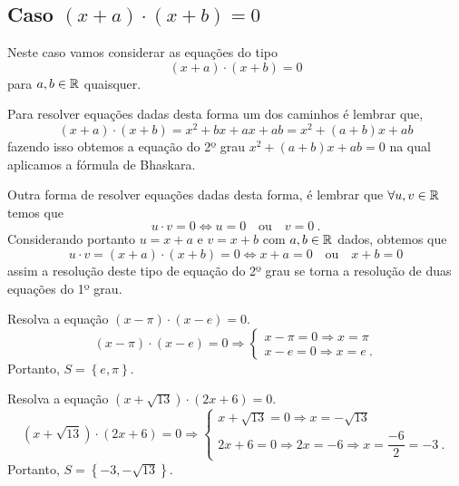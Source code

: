 \subsection{Caso \texorpdfstring{$(x+a)\cdot (x+b)= 0$}{(x+a)(x+b) = 0}}
 Neste caso vamos considerar as equações do tipo
\begin{equation}
(x+a)\cdot (x+b)= 0
\end{equation}
para $a, b \in \mathbb{R}$ quaisquer.

Para resolver equações dadas desta forma um dos caminhos é lembrar que,
\begin{equation}
(x+a)\cdot (x+b)= x^2 + bx + ax + ab= x^2 + (a + b)x + ab
\end{equation}
fazendo isso obtemos a equação do 2º grau $x^2 + (a + b)x + ab= 0$ na qual aplicamos a fórmula de Bhaskara.

Outra forma de resolver equações dadas desta forma, é lembrar que $\forall u, v \in \mathbb{R}$ temos que
\begin{equation}
u \cdot v= 0 \Leftrightarrow u= 0 \ \ \ \text{ ou } \ \ \ v=0 \ .
\end{equation}
Considerando portanto $u= x+a$ e $v= x+b$ com $a, b \in \mathbb{R}$ dados, obtemos que
\begin{equation}
u \cdot v= (x+a)\cdot (x+b)= 0 \Leftrightarrow x+a= 0 \ \ \ \text{ ou } \ \ \ x+b=0
\end{equation}
assim a resolução deste tipo de equação do 2º grau se torna a resolução de duas equações do 1º grau.

\begin{exem}
 Resolva a equação $(x - \pi) \cdot (x - e)= 0$.
\[(x - \pi) \cdot (x - e)= 0 \Rightarrow
\begin{cases}
 x - \pi=0 \Rightarrow x= \pi \\
 x - e= 0 \Rightarrow x= e \ .
\end{cases} \]
Portanto, $S= \left\{ e, \pi \right\}$.
 \end{exem}

 \begin{exem}
  Resolva a equação $(x + \sqrt{13}) \cdot (2x + 6)= 0$.
\[(x + \sqrt{13}) \cdot (2x + 6)= 0 \Rightarrow
\begin{cases}
 x + \sqrt{13}=0 \Rightarrow x= - \sqrt{13} \\
 2x + 6= 0 \Rightarrow 2x= -6 \Rightarrow x= \dfrac{-6}{2}= -3 \ .
\end{cases} \]
Portanto, $S= \left\{ -3, - \sqrt{13} \right\}$.
 \end{exem}

